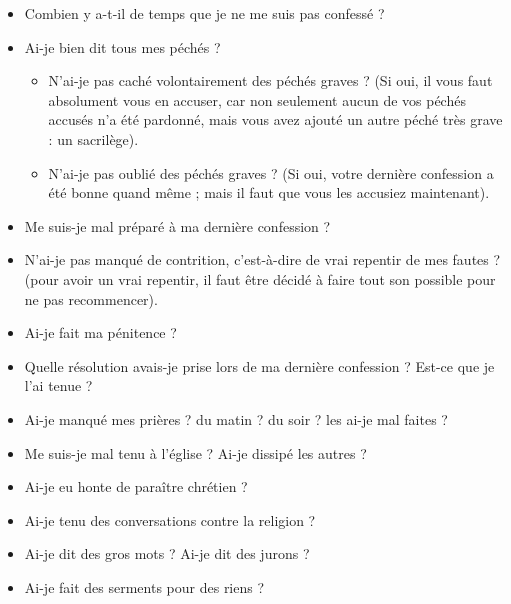 
\begin{itemize}
\item Combien y a-t-il de temps que je ne me suis pas confessé ?
\item Ai-je bien dit tous mes péchés ?
  \begin{itemize}
  \item N’ai-je pas caché volontairement des péchés graves ? (Si oui, il vous faut absolument vous en accuser, car non seulement aucun de vos péchés accusés n’a été pardonné, mais vous avez ajouté un autre péché très grave : un sacrilège).
  \item N’ai-je pas oublié des péchés graves ? (Si oui, votre dernière confession a été bonne quand même ; mais il faut que vous les accusiez maintenant).
  \end{itemize}
\item Me suis-je mal préparé à ma dernière confession ?
\item N’ai-je pas manqué de contrition, c’est-à-dire de vrai repentir de mes fautes ? (pour avoir un vrai repentir, il faut être décidé à faire tout son possible pour ne pas recommencer).
\item Ai-je fait ma pénitence ?
\item Quelle résolution avais-je prise lors de ma dernière confession ? Est-ce que je l’ai tenue ?
\end{itemize}



\begin{itemize}
\item Ai-je manqué mes prières ? du matin ? du soir ? les ai-je mal faites ?
\item Me suis-je mal tenu à l’église ? Ai-je dissipé les autres ?
\item Ai-je eu honte de paraître chrétien ?
\item Ai-je tenu des conversations contre la religion ?
\end{itemize}

\begin{itemize}
\item Ai-je dit des gros mots ? Ai-je dit des jurons ?
\item Ai-je fait des serments pour des riens ?
\end{itemize}

